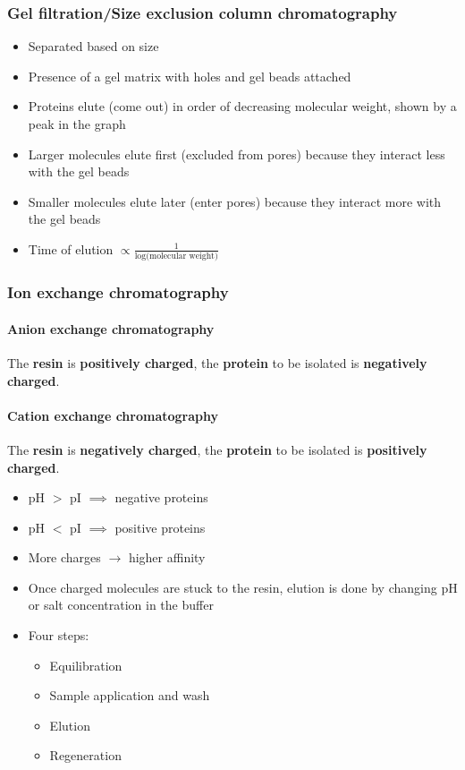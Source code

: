 \documentclass[letterpaper, 12pt]{article}
\begin{document}
\subsubsection*{Gel filtration/Size exclusion column chromatography}

\begin{itemize}
\item Separated based on size
\item Presence of a gel matrix with holes and gel beads attached
\item Proteins elute (come out) in order of decreasing molecular weight, shown by a peak in the graph
\item Larger molecules elute first (excluded from pores) because they interact less with the gel beads
\item Smaller molecules elute later (enter pores) because they interact more with the gel beads
\item Time of elution $\displaystyle \propto \frac{1}{\log \text{(molecular weight)}}$
\end{itemize}

\subsubsection*{Ion exchange chromatography}

\paragraph{Anion exchange chromatography} The \textbf{resin} is \textbf{positively charged}, the \textbf{protein} to be isolated is \textbf{negatively charged}.

\paragraph{Cation exchange chromatography} The \textbf{resin} is \textbf{negatively charged}, the \textbf{protein} to be isolated is \textbf{positively charged}.

\begin{itemize}
\item pH $>$ pI $\implies$ negative proteins
\item pH $<$ pI $\implies$ positive proteins
\item More charges $\to$ higher affinity
\item Once charged molecules are stuck to the resin, elution is done by changing pH or salt concentration in the buffer
\item Four steps:
\begin{itemize}
\item Equilibration
\item Sample application and wash
\item Elution
\item Regeneration
\end{itemize}
\end{itemize}
\end{document}
